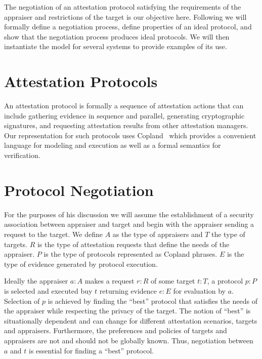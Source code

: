 \documentclass[sigconf,authordraft]{acmart}
\begin{document}
The negotiation of an attestation protocol satisfying the requirements
of the appraiser and restrictions of the target is our objective here.
Following we will formally define a negotiation process, define
properties of an ideal protocol, and show that the negotiation process
produces ideal protocols.  We will then instantiate the model for
several systems to provide examples of its use.

\section{Attestation Protocols}

An attestation protocol is formally a sequence of attestation actions
that can include gathering evidence in sequence and parallel,
generating cryptographic signatures, and requesting attestation
results from other attestation managers.  Our representation for such
protocols uses Copland~\citep{Ramsdell:2019aa} which provides a
convenient language for modeling and execution as well as a formal
semantics for verification.


\section{Protocol Negotiation}

For the purposes of his discussion we will assume the establishment of
a security association between appraiser and target and begin with the
appraiser sending a request to the target.  We define $A$ as the type
of appraisers and $T$ the type of targets.  $R$ is the type of
attestation requests that define the needs of the appraiser.  $P$ is
the type of protocols represented as Copland phrases.  $E$ is the type
of evidence generated by protocol execution.

Ideally the appraiser $a:A$ makes a request $r:R$ of some target
$t:T$, a protocol $p:P$ is selected and executed buy $t$ returning
evidence $e:E$ for evaluation by $a$.  Selection of $p$ is achieved by
finding the ``best'' protocol that satisfies the needs of the
appraiser while respecting the privacy of the target. The notion of
``best'' is situationally dependent and can change for different
attestation scenarios, targets and appraisers.  Furthermore, the
preferences and policies of targets and appraisers are not and should
not be globally known.  Thus, negotiation between $a$ and $t$ is
essential for finding a ``best'' protocol.
\end{document}
